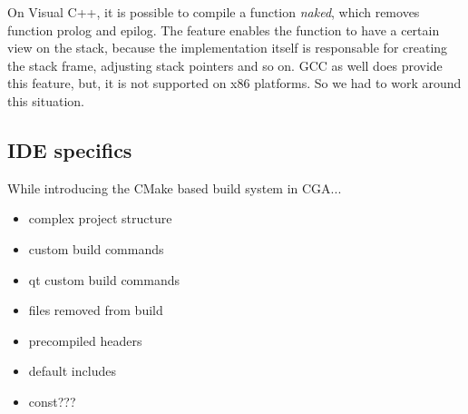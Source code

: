 On Visual C++, it is possible to compile a function \emph{naked}, which removes function prolog and epilog. The feature enables the function to have a certain view on the stack, because the implementation itself is responsable for creating the stack frame, adjusting stack pointers and so on. GCC as well does provide this feature, but, it is not supported on x86 platforms. So we had to work around this situation.

\subsection{IDE specifics} While introducing the CMake based build system in CGA... 
\begin{itemize}
	
	\item complex project structure
	
	\item custom build commands
	
	\item qt custom build commands
	
	\item files removed from build
	
	\item precompiled headers
	
	\item default includes
	
	\item const??? 
\end{itemize}

